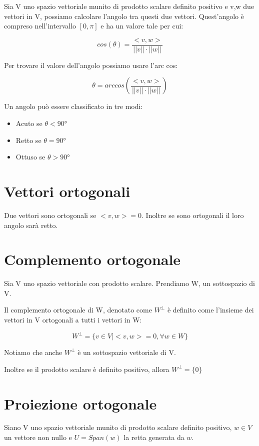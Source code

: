 \documentclass[a4paper, 10pt]{article}
\begin{document}
Sia V uno spazio vettoriale munito di prodotto scalare definito positivo e v,w due vettori in V, possiamo calcolare l'angolo tra questi due vettori. Quest'angolo è compreso nell'intervallo $[0, \pi]$ e ha un valore tale per cui:

$$cos(\theta)=\frac{<v,w>}{||v|| \cdot ||w||}$$

Per trovare il valore dell'angolo possiamo usare l'arc cos:

$$\theta = arc cos(\frac{<v,w>}{||v|| \cdot ||w||})$$

Un angolo può essere classificato in tre modi:

\begin{itemize}
	\item Acuto se $\theta < 90$°
	\item Retto se $\theta = 90$°
	\item Ottuso se $\theta > 90$°
\end{itemize}

\section{Vettori ortogonali}

Due vettori sono ortogonali se $<v,w>=0$. Inoltre se sono ortogonali il loro angolo sarà retto.

\section{Complemento ortogonale}

Sia V uno spazio vettoriale con prodotto scalare. Prendiamo W, un sottospazio di V.

Il complemento ortogonale di W, denotato come $W^\perp$ è definito come l'insieme dei vettori in V ortogonali a tutti i vettori in W:

$$W^\perp = \{v \in V | <v,w>=0, \forall w \in W\}$$

Notiamo che anche $W^\perp$ è un sottospazio vettoriale di V.

Inoltre se il prodotto scalare è definito positivo, allora $W^\perp = \{0\}$

\section{Proiezione ortogonale}

Siano V uno spazio vettoriale munito di prodotto scalare definito positivo, $w \in V$ un vettore non nullo e $U=Span(w)$ la retta generata da $w$.
\end{document}
